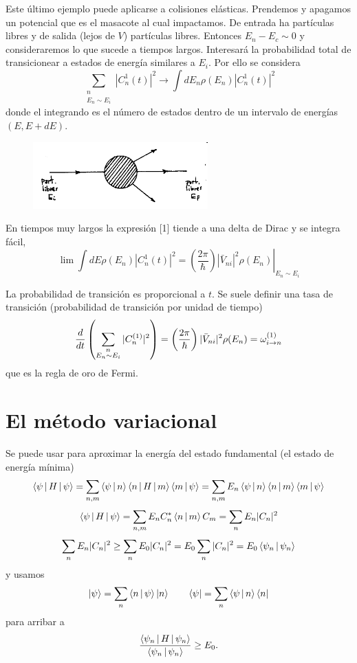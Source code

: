 \documentclass[10pt,oneside]{CBFT_book}
\begin{document}
Este último ejemplo puede aplicarse a colisiones elásticas. Prendemos y apagamos un potencial que es el 
masacote al cual impactamos. De entrada ha partículas libres y de salida (lejos de $V$) partículas libres.
Entonces $ E_n - E_c \sim 0$ y consideraremos lo que sucede a tiempos largos. Interesará la probabilidad 
total de transicionear a estados de energía similares a $E_i$. Por ello se considera 
\[
	\sum_{\substack{n \\ E_n\sim E_i}} |C^1_n(t)|^2 \longrightarrow \int dE_n \rho(E_n) |C^1_n(t)|^2
\]
donde el integrando es el número de estados dentro de un intervalo de energías $(E,E+dE)$.
\begin{figure}[htb]
	\begin{center}
	\includegraphics[width=0.6\textwidth]{images/teo2_23.pdf}
	\end{center}
	\caption{}
\end{figure} 
En tiempos muy largos la expresión [1] tiende a una delta de Dirac y se integra fácil,
\[
	\lim  \int dE\rho(E_n) |C^1_n(t)|^2 = \left.\left(\frac{2\pi}{\hbar}\right)
		|\bar{V}_{ni}|^2 \rho(E_n)\right|_{E_n\sim E_i}
\]

La probabilidad de transición es proporcional a $t$. Se suele definir una tasa de transición (probabilidad de 
transición por unidad de tiempo)
\[
	\frac{d^{\hspace{-0.05em}} {}}{d {t}^{\hspace{-0.05em}}}\left( \sum_{\substack{n \\ E_n\sim E_i}} |C_n^{(1)}|^2 \right) =
	\left(\frac{2\pi}{\hbar}\right)	|\bar{V}_{ni}|^2 \rho(E_n) = \omega_{i\to n}^{(1)}
\]
que es la regla de oro de Fermi.

\section{El método variacional}

Se puede usar para aproximar la energía del estado fundamental (el estado de energía mínima)
\[
	\Braket{\psi|H|\psi} = \sum_{n,m}\Braket{\psi|n}\Braket{n|H|m}\Braket{m|\psi} =
		\sum_{n,m} E_n \Braket{\psi|n}\Braket{n|m}\Braket{m|\psi} 
\]
\[
	\Braket{\psi|H|\psi} = \sum_{n,m} E_n C_n^*\Braket{n|m}C_m = \sum_{n} E_n|C_n|^2
\]
\[
	\sum_{n} E_n|C_n|^2 \geq \sum_n E_0|C_n|^2 = E_0 \sum_n |C_n|^2 = E_0 \Braket{\psi_n|\psi_n}
\]
y usamos 
\[
\Ket{\psi} = \sum_n \Braket{n|\psi}\Ket{n} \qquad \Bra{\psi} = \sum_n \Braket{\psi|n}\Bra{n} 
\]
para arribar a
\[
	\frac{\Braket{\psi_n|H|\psi_n}}{\Braket{\psi_n|\psi_n}} \geq E_0.
\]
\end{document}
